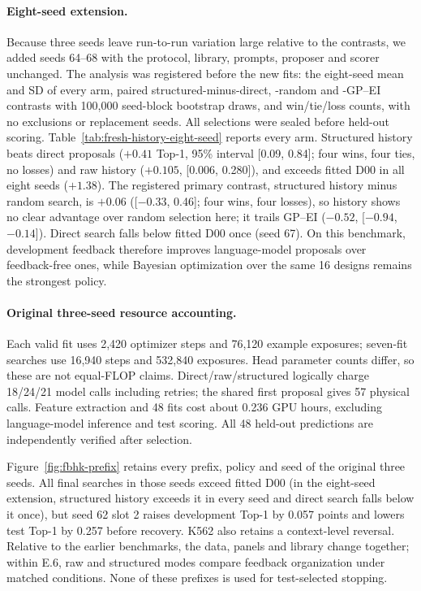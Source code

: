 \paragraph{Eight-seed extension.} Because three seeds leave run-to-run variation large relative to the contrasts, we added seeds 64--68 with the protocol, library, prompts, proposer and scorer unchanged. The analysis was registered before the new fits: the eight-seed mean and SD of every arm, paired structured-minus-direct, -random and -GP--EI contrasts with 100,000 seed-block bootstrap draws, and win/tie/loss counts, with no exclusions or replacement seeds. All selections were sealed before held-out scoring. Table~\ref{tab:fresh-history-eight-seed} reports every arm. Structured history beats direct proposals ($+0.41$ Top-1, 95\% interval [0.09, 0.84]; four wins, four ties, no losses) and raw history ($+0.105$, [0.006, 0.280]), and exceeds fitted D00 in all eight seeds ($+1.38$). The registered primary contrast, structured history minus random search, is $+0.06$ ([$-0.33$, 0.46]; four wins, four losses), so history shows no clear advantage over random selection here; it trails GP--EI ($-0.52$, [$-0.94$, $-0.14$]). Direct search falls below fitted D00 once (seed 67). On this benchmark, development feedback therefore improves language-model proposals over feedback-free ones, while Bayesian optimization over the same 16 designs remains the strongest policy.



\paragraph{Original three-seed resource accounting.} Each valid fit uses 2,420 optimizer steps and 76,120 example exposures; seven-fit searches use 16,940 steps and 532,840 exposures. Head parameter counts differ, so these are not equal-FLOP claims. Direct/raw/structured logically charge 18/24/21 model calls including retries; the shared first proposal gives 57 physical calls. Feature extraction and 48 fits cost about 0.236 GPU hours, excluding language-model inference and test scoring. All 48 held-out predictions are independently verified after selection.

Figure~\ref{fig:fbhk-prefix} retains every prefix, policy and seed of the original three seeds. All final searches in those seeds exceed fitted D00 (in the eight-seed extension, structured history exceeds it in every seed and direct search falls below it once), but seed 62 slot 2 raises development Top-1 by 0.057 points and lowers test Top-1 by 0.257 before recovery. K562 also retains a context-level reversal. Relative to the earlier benchmarks, the data, panels and library change together; within E.6, raw and structured modes compare feedback organization under matched conditions. None of these prefixes is used for test-selected stopping.

